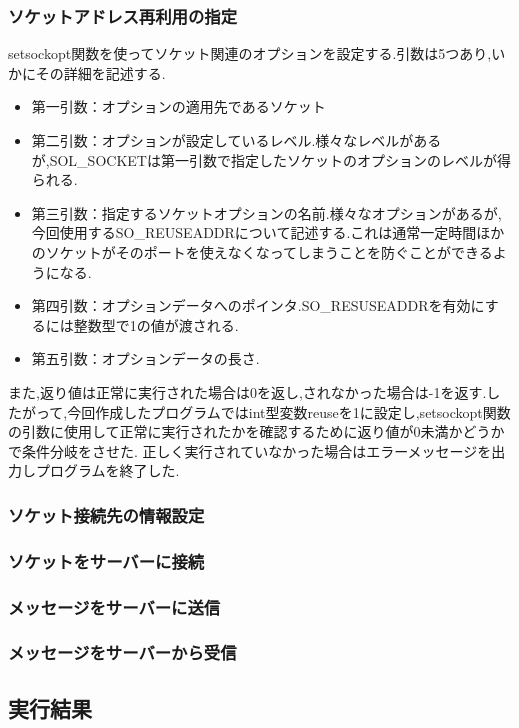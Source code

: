 \documentclass[dvipdfmx]{jarticle}
\begin{document}
\subsubsection{ソケットアドレス再利用の指定}
setsockopt関数を使ってソケット関連のオプションを設定する.引数は5つあり,いかにその詳細を記述する.\cite{6}\cite{7}
\begin{itemize}
    \item 第一引数：オプションの適用先であるソケット
    \item 第二引数：オプションが設定しているレベル.様々なレベルがあるが,SOL\_SOCKETは第一引数で指定したソケットのオプションのレベルが得られる.
    \item 第三引数：指定するソケットオプションの名前.様々なオプションがあるが,今回使用するSO\_REUSEADDRについて記述する.これは通常一定時間ほかのソケットがそのポートを使えなくなってしまうことを防ぐことができるようになる.\cite{8}
    \item 第四引数：オプションデータへのポインタ.SO\_RESUSEADDRを有効にするには整数型で1の値が渡される.
    \item 第五引数：オプションデータの長さ.
\end{itemize}
また,返り値は正常に実行された場合は0を返し,されなかった場合は-1を返す.したがって,今回作成したプログラムではint型変数reuseを1に設定し,setsockopt関数の引数に使用して正常に実行されたかを確認するために返り値が0未満かどうかで条件分岐をさせた.
正しく実行されていなかった場合はエラーメッセージを出力しプログラムを終了した.
\subsubsection{ソケット接続先の情報設定}

\subsubsection{ソケットをサーバーに接続}

\subsubsection{メッセージをサーバーに送信}

\subsubsection{メッセージをサーバーから受信}

\subsection{実行結果}
\end{document}

